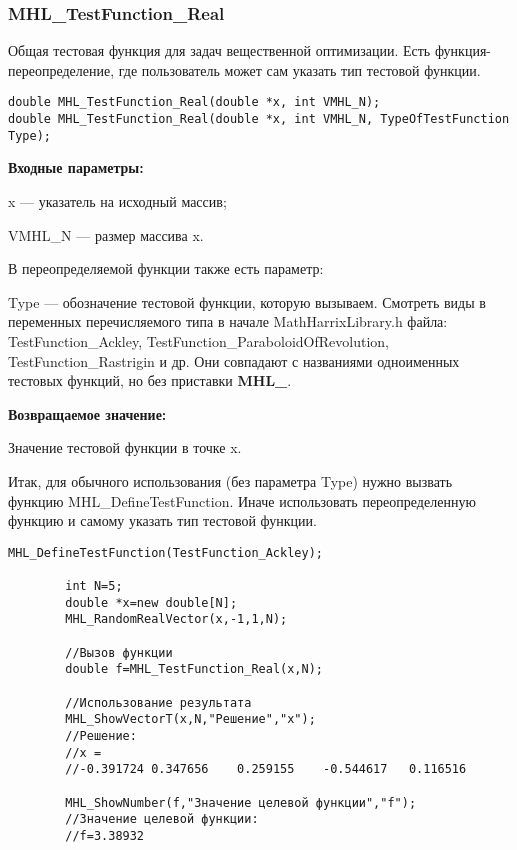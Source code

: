 \documentclass[a4paper,12pt]{article}
\begin{document}
\subsubsection{MHL\_TestFunction\_Real}\label{MHL_TestFunction_Real}

Общая тестовая функция для задач вещественной оптимизации. Есть функция-переопределение, где пользователь может сам указать тип тестовой функции.


\begin{lstlisting}[label=code_syntax_MHL_TestFunction_Real,caption=Синтаксис]
double MHL_TestFunction_Real(double *x, int VMHL_N);
double MHL_TestFunction_Real(double *x, int VMHL_N, TypeOfTestFunction Type);
\end{lstlisting}

\textbf{Входные параметры:}

x --- указатель на исходный массив;

VMHL\_N --- размер массива x.

В переопределяемой функции также есть параметр:
  
Type --- обозначение тестовой функции, которую вызываем.
Смотреть виды в переменных перечисляемого типа в начале MathHarrixLibrary.h файла: TestFunction\_Ackley, TestFunction\_ParaboloidOfRevolution, TestFunction\_Rastrigin и др. Они совпадают с названиями одноименных тестовых функций, но без приставки \textbf{MHL\_}.

\textbf{Возвращаемое значение:}
 
Значение тестовой функции в точке x.

Итак, для обычного использования (без параметра Type) нужно вызвать функцию MHL\_DefineTestFunction. Иначе использовать переопределенную функцию и самому указать тип тестовой функции.


\begin{lstlisting}[label=code_use_MHL_TestFunction_Real,caption=Пример использования]
        MHL_DefineTestFunction(TestFunction_Ackley);

        int N=5;
        double *x=new double[N];
        MHL_RandomRealVector(x,-1,1,N);

        //Вызов функции
        double f=MHL_TestFunction_Real(x,N);

        //Использование результата
        MHL_ShowVectorT(x,N,"Решение","x");
        //Решение:
        //x =
        //-0.391724	0.347656	0.259155	-0.544617	0.116516

        MHL_ShowNumber(f,"Значение целевой функции","f");
        //Значение целевой функции:
        //f=3.38932
\end{lstlisting}
\end{document}
